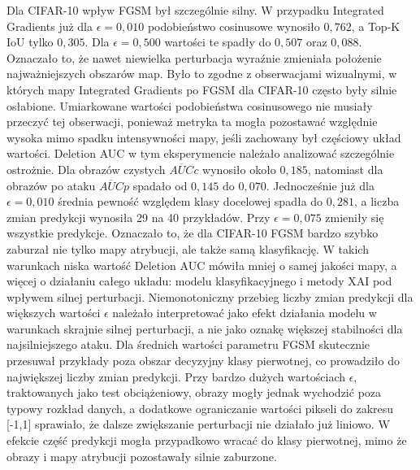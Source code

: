 Dla CIFAR-10 wpływ FGSM był szczególnie silny. W przypadku Integrated Gradients już dla $\epsilon = 0{,}010$ podobieństwo cosinusowe wynosiło $0{,}762$, a Top-K IoU tylko $0{,}305$. Dla $\epsilon = 0{,}500$ wartości te spadły do $0{,}507$ oraz $0{,}088$. Oznaczało to, że nawet niewielka perturbacja wyraźnie zmieniała położenie najważniejszych obszarów map. Było to zgodne z obserwacjami wizualnymi, w których mapy Integrated Gradients po FGSM dla CIFAR-10 często były silnie osłabione. Umiarkowane wartości podobieństwa cosinusowego nie musiały przeczyć tej obserwacji, ponieważ metryka ta mogła pozostawać względnie wysoka mimo spadku intensywności mapy, jeśli zachowany był częściowy układ wartości. Deletion AUC w tym eksperymencie należało analizować szczególnie ostrożnie. Dla obrazów czystych $\overline{AUC}{c}$ wynosiło około $0{,}185$, natomiast dla obrazów po ataku $\overline{AUC}{p}$ spadało od $0{,}145$ do $0{,}070$. Jednocześnie już dla $\epsilon = 0{,}010$ średnia pewność względem klasy docelowej spadła do $0{,}281$, a liczba zmian predykcji wynosiła 29 na 40 przykładów. Przy $\epsilon = 0{,}075$ zmieniły się wszystkie predykcje. Oznaczało to, że dla CIFAR-10 FGSM bardzo szybko zaburzał nie tylko mapy atrybucji, ale także samą klasyfikację. W takich warunkach niska wartość Deletion AUC mówiła mniej o samej jakości mapy, a więcej o działaniu całego układu: modelu klasyfikacyjnego i metody XAI pod wpływem silnej perturbacji. Niemonotoniczny przebieg liczby zmian predykcji dla większych wartości $\epsilon$ należało interpretować jako efekt działania modelu w warunkach skrajnie silnej perturbacji, a nie jako oznakę większej stabilności dla najsilniejszego ataku. Dla średnich wartości parametru FGSM skutecznie przesuwał przykłady poza obszar decyzyjny klasy pierwotnej, co prowadziło do największej liczby zmian predykcji. Przy bardzo dużych wartościach $\epsilon$, traktowanych jako test obciążeniowy, obrazy mogły jednak wychodzić poza typowy rozkład danych, a dodatkowe ograniczanie wartości pikseli do zakresu [-1,1] sprawiało, że dalsze zwiększanie perturbacji nie działało już liniowo. W efekcie część predykcji mogła przypadkowo wracać do klasy pierwotnej, mimo że obrazy i mapy atrybucji pozostawały silnie zaburzone.

